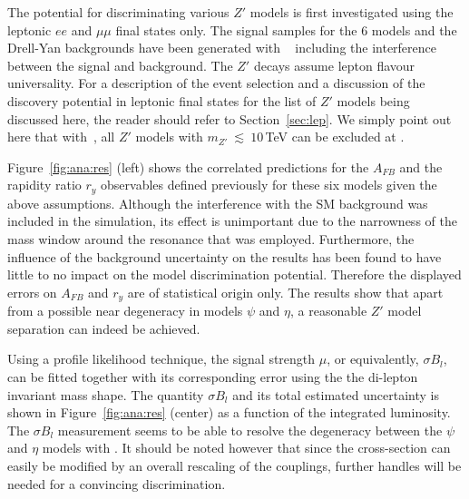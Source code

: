 \documentclass[a4paper,11pt]{article}
\begin{document}
The potential for discriminating various $Z'$ models is first investigated using the leptonic $ee$ and $\mu\mu$ final states only. The signal samples for the 6 models and the Drell-Yan backgrounds have been generated with \py~\cite{Sjostrand:2014zea} including the interference between the signal and background. The $Z'$ decays assume lepton flavour universality. For a description of the event selection and a discussion of the discovery potential in leptonic final states for the list of $Z'$ models being discussed here, the reader should refer to Section~\ref{sec:lep}. We simply point out here that with \intlumihelhc\,, all $Z'$ models with $m_{Z'}~\lesssim~10$\,TeV can be excluded at \sqrtshelhc.

Figure~\ref{fig:ana:res} (left) shows the correlated predictions for the $A_{FB}$ and the rapidity ratio $r_y$ observables defined previously for these six models given the above assumptions. Although the interference with the SM background was included in the simulation, its effect is unimportant due to the narrowness of the mass window around the resonance that was employed. Furthermore, the influence of the background uncertainty on the results has been found to have little to no impact on the model discrimination potential. Therefore the displayed errors on $A_{FB}$ and $r_y$ are of statistical origin only. The results show that apart from a possible near degeneracy in models $\psi$ and $\eta$, a reasonable $Z'$ model separation can indeed be achieved.

Using a profile likelihood technique, the signal strength $\mu$, or equivalently, $\sigma B_l$, can be fitted together with its corresponding error using the the di-lepton invariant mass shape. The quantity $\sigma B_l$ and its total estimated uncertainty is shown in Figure~\ref{fig:ana:res} (center) as a function of the integrated luminosity. The $\sigma B_l$ measurement seems to be able to resolve the degeneracy between the $\psi$ and $\eta$ models with \intlumihelhc. It should be noted however that since the cross-section can easily be modified by an overall rescaling of the couplings, further handles will be needed for a convincing discrimination.
\end{document}

